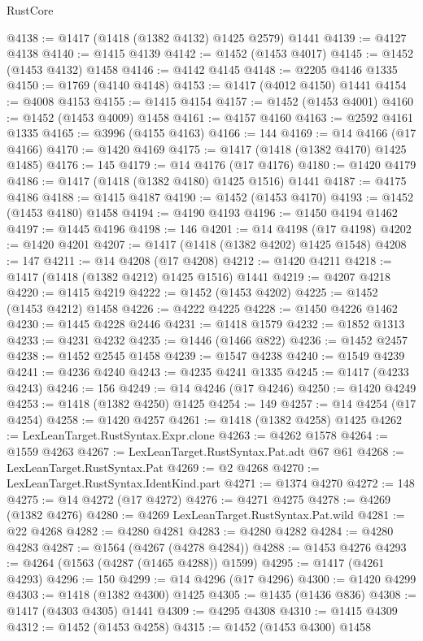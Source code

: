 \begin{lexlean}{RustCore}
\begin{coremodule}
@4138 := @1417 (@1418 (@1382 @4132) @1425 @2579) @1441
@4139 := @4127 @4138
@4140 := @1415 @4139
@4142 := @1452 (@1453 @4017)
@4145 := @1452 (@1453 @4132) @1458
@4146 := @4142 @4145
@4148 := @2205 @4146 @1335
@4150 := @1769 (@4140 @4148)
@4153 := @1417 (@4012 @4150) @1441
@4154 := @4008 @4153
@4155 := @1415 @4154
@4157 := @1452 (@1453 @4001)
@4160 := @1452 (@1453 @4009) @1458
@4161 := @4157 @4160
@4163 := @2592 @4161 @1335
@4165 := @3996 (@4155 @4163)
@4166 := 144
@4169 := @14 @4166 (@17 @4166)
@4170 := @1420 @4169
@4175 := @1417 (@1418 (@1382 @4170) @1425 @1485)
@4176 := 145
@4179 := @14 @4176 (@17 @4176)
@4180 := @1420 @4179
@4186 := @1417 (@1418 (@1382 @4180) @1425 @1516) @1441
@4187 := @4175 @4186
@4188 := @1415 @4187
@4190 := @1452 (@1453 @4170)
@4193 := @1452 (@1453 @4180) @1458
@4194 := @4190 @4193
@4196 := @1450 @4194 @1462
@4197 := @1445 @4196
@4198 := 146
@4201 := @14 @4198 (@17 @4198)
@4202 := @1420 @4201
@4207 := @1417 (@1418 (@1382 @4202) @1425 @1548)
@4208 := 147
@4211 := @14 @4208 (@17 @4208)
@4212 := @1420 @4211
@4218 := @1417 (@1418 (@1382 @4212) @1425 @1516) @1441
@4219 := @4207 @4218
@4220 := @1415 @4219
@4222 := @1452 (@1453 @4202)
@4225 := @1452 (@1453 @4212) @1458
@4226 := @4222 @4225
@4228 := @1450 @4226 @1462
@4230 := @1445 @4228 @2446
@4231 := @1418 @1579
@4232 := @1852 @1313
@4233 := @4231 @4232
@4235 := @1446 (@1466 @822)
@4236 := @1452 @2457
@4238 := @1452 @2545 @1458
@4239 := @1547 @4238
@4240 := @1549 @4239
@4241 := @4236 @4240
@4243 := @4235 @4241 @1335
@4245 := @1417 (@4233 @4243)
@4246 := 156
@4249 := @14 @4246 (@17 @4246)
@4250 := @1420 @4249
@4253 := @1418 (@1382 @4250) @1425
@4254 := 149
@4257 := @14 @4254 (@17 @4254)
@4258 := @1420 @4257
@4261 := @1418 (@1382 @4258) @1425
@4262 := LexLeanTarget.RustSyntax.Expr.clone
@4263 := @4262 @1578
@4264 := @1559 @4263
@4267 := LexLeanTarget.RustSyntax.Pat.adt @67 @61
@4268 := LexLeanTarget.RustSyntax.Pat
@4269 := @2 @4268
@4270 := LexLeanTarget.RustSyntax.IdentKind.part
@4271 := @1374 @4270
@4272 := 148
@4275 := @14 @4272 (@17 @4272)
@4276 := @4271 @4275
@4278 := @4269 (@1382 @4276)
@4280 := @4269 LexLeanTarget.RustSyntax.Pat.wild
@4281 := @22 @4268
@4282 := @4280 @4281
@4283 := @4280 @4282
@4284 := @4280 @4283
@4287 := @1564 (@4267 (@4278 @4284))
@4288 := @1453 @4276
@4293 := @4264 (@1563 (@4287 (@1465 @4288)) @1599)
@4295 := @1417 (@4261 @4293)
@4296 := 150
@4299 := @14 @4296 (@17 @4296)
@4300 := @1420 @4299
@4303 := @1418 (@1382 @4300) @1425
@4305 := @1435 (@1436 @836)
@4308 := @1417 (@4303 @4305) @1441
@4309 := @4295 @4308
@4310 := @1415 @4309
@4312 := @1452 (@1453 @4258)
@4315 := @1452 (@1453 @4300) @1458

\end{coremodule}
\end{lexlean}
